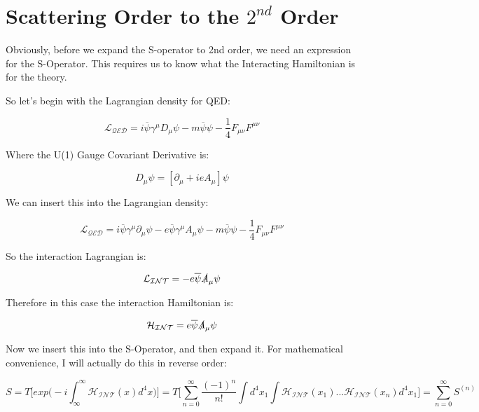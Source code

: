 \documentclass[a4]{article}
\begin{document}
    \section{Scattering Order to the $2^{nd}$ Order}

        Obviously, before we expand the S-operator to 2nd order, we need an expression for the S-Operator. This
        requires us to know what the Interacting Hamiltonian is for the theory.

        So let's begin with the Lagrangian density for QED:

        \begin{equation}
            \mathcal{L_{QED}} = i \overline{\psi} \gamma^{\mu} D_{\mu} \psi - m \overline{\psi} \psi - \frac{1}{4} F_{\mu\nu} F^{\mu\nu}
        \end{equation}

        Where the U(1) Gauge Covariant Derivative is:

        \begin{equation}
            D_{\mu} \psi = [\partial_{\mu} + i e A_{\mu}] \psi
        \end{equation}

        We can insert this into the Lagrangian density:

        \begin{equation}
            \mathcal{L_{QED}} = i \overline{\psi} \gamma^{\mu} \partial_{\mu} \psi - e \overline{\psi} \gamma^{\mu} A_{\mu} \psi - m \overline{\psi} \psi - \frac{1}{4} F_{\mu\nu} F^{\mu\nu}
        \end{equation}

        So the interaction Lagrangian is:

        \begin{equation}
            \mathcal{L_{INT}} = - e \overline{\psi} \slashed{A}_{\mu} \psi
        \end{equation}

        Therefore in this case the interaction Hamiltonian is:

        \begin{equation}
            \mathcal{H_{INT}} = e \overline{\psi} \slashed{A}_{\mu} \psi
        \end{equation}

        Now we insert this into the S-Operator, and then expand it. For mathematical convenience, I will actually do this in reverse order:

        \begin{equation}
            S = T \bigg[ exp \bigg( -i \int_{\infty}^{\infty} \mathcal{H_{INT}} (x) d^{4}x \bigg) \bigg] = T \bigg[ \sum_{n = 0}^{\infty} \frac{(-1)^n}{n!} \int d^{4} x_{1} \int \mathcal{H_{INT}} (x_1) ... \mathcal{H_{INT}} (x_n) d^{4} x_{1} \bigg] = \sum_{n = 0}^{\infty} S^{(n)}
        \end{equation}
\end{document}
